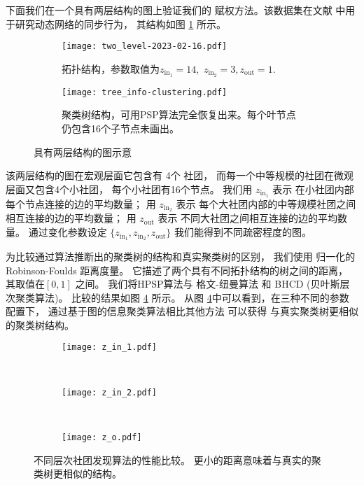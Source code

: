 下面我们在一个具有两层结构的图上验证我们的
赋权方法。该数据集在文献
\cite{RN22} 中用于研究动态网络的同步行为，
其结构如图 \ref{fig:c1} 所示。 

\begin{figure}
	\centering
	\begin{subfigure}{0.45\textwidth}
		\texttt{[image: two\_level-2023-02-16.pdf]}
		\caption{拓扑结构，参数取值为$z_{\mathrm{in}_1} = 14,$ $z_{\mathrm{in}_2} = 3, z_{\mathrm{out}}=1$.}\label{fig:c1}
	\end{subfigure}
	\begin{subfigure}{0.45\textwidth}
		\texttt{[image: tree\_info-clustering.pdf]}
		\caption{聚类树结构，可用PSP算法完全恢复出来。每个叶节点仍包含16个子节点未画出。}
    \label{fig:c2}
	\end{subfigure}
	\caption{具有两层结构的图示意}
\end{figure}

该两层结构的图在宏观层面它包含有 4个 社团，
而每一个中等规模的社团在微观层面又包含4个小社团，
每个小社团有16个节点。
我们用 $z_{\mathrm{in}_1}$ 表示
在小社团内部每个节点连接的边的平均数量；
用 $z_{\mathrm{in}_2}$ 表示
每个大社团内部的中等规模社团之间相互连接的边的平均数量；
用 $z_{\mathrm{out}}$ 表示
不同大社团之间相互连接的边的平均数量。
通过变化参数设定 $\{z_{\mathrm{in}_1}, z_{\mathrm{in}_2}, z_{\mathrm{out}} \}$
我们能得到不同疏密程度的图。

为比较通过算法推断出的聚类树的结构和真实聚类树的区别，
我们使用 归一化的 Robinson-Foulds 距离度量。
它描述了两个具有不同拓扑结构的树之间的距离，
其取值在$[0,1]$ 之间。
我们将HPSP算法与
格文-纽曼算法\cite{girvan2002community}
和 BHCD (贝叶斯层次聚类算法\cite{RN23})。
比较的结果如图 \ref{fig:cdr} 所示。
从图 \ref{fig:cdr}中可以看到，在三种不同的参数配置下，
通过基于图的信息聚类算法相比其他方法 可以获得
与真实聚类树更相似的聚类树结构。

\begin{figure}
	\centering
	\begin{subfigure}{0.33\textwidth}
		\texttt{[image: z\_in\_1.pdf]}
		\caption{}
	\end{subfigure}~
	\begin{subfigure}{0.33\textwidth}
		\texttt{[image: z\_in\_2.pdf]}
		\caption{}
	\end{subfigure}~
	\begin{subfigure}{0.33\textwidth}
		\texttt{[image: z\_o.pdf]}
		\caption{}
	\end{subfigure}
	\caption{不同层次社团发现算法的性能比较。
  更小的距离意味着与真实的聚类树更相似的结构。
  }\label{fig:cdr}	
\end{figure}

